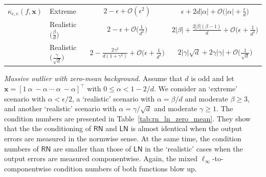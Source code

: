 \documentclass[namedate,webpdf,imanum]{ima-authoring-template}
\newcommand{\Matrix}[1]{\mathbf{#1}}
\newcommand{\trans}{\intercal}
\newcommand{\Layer}[1]{\mathsf{#1}}
\newcommand{\cond}[3][]{\kappa_{\mathrm{#2}} #1( #3 #1)}
\newcommand{\Oh}[2][]{\mathcal{O}#1( #2 #1)}
\numberwithin{equation}{section}
\begin{document}
\begin{table}[t]
\begin{tabular}{@{}llcc@{}}
\midrule
$\cond{c,c}{f,\Matrix{x}}$
& Extreme
& $2 - \epsilon + \Oh{\epsilon^2}$
& $\epsilon + 2d|\alpha| + \Oh[\Big]{|\alpha| + \frac{\epsilon}{d}}$ \\
%
& Realistic $\Big(\tfrac{\beta}{d}\Big)$
& $2 - \epsilon + \Oh[\Big]{\frac{1}{d^2}}$
& $2|\beta| + \frac{2|\beta|(\beta-1)}{d} + \Oh[\Big]{\epsilon + \frac{1}{d^2}}$ \\
%
& Realistic $\Big(\tfrac{\gamma}{\sqrt{d}}\Big)$
& $2 - \frac{2\gamma^2}{d(1+\gamma^2)} + \Oh[\Big]{\epsilon + \frac{1}{d^2}}$
& $2|\gamma|\sqrt{d} + 2\gamma|\gamma| + \Oh[\Big]{\frac{1}{\sqrt{d}}}$ \\
\midrule
\end{tabular}
\end{table}

\emph{Massive outlier with zero-mean background.}
Assume that $d$ is odd and let $\Matrix{x} = [1~\alpha~-\alpha~\cdots~\alpha~-\alpha]^\trans$ with $0 \leq \alpha < 1 - 2/d$.
We consider an `extreme' scenario with $\alpha < \epsilon/2$, a `realistic' scenario with $\alpha = \beta / d$ and moderate $\beta \geq 3$, and another `realistic' scenario with $\alpha = \gamma / \sqrt{d}$ and moderate $\gamma \geq 1$.
The condition numbers are presented in Table~\ref{tab:rn_ln_zero_mean}.
They show that the the conditioning of $\Layer{RN}$ and $\Layer{LN}$ is almost identical when the output errors are measured in the normwise sense.
At the same time, the condition numbers of $\Layer{RN}$ are smaller than those of $\Layer{LN}$ in the `realistic' cases when the output errors are measured componentwise.
Again, the mixed $\ell_\infty$-to-componentwise condition numbers of both functions blow up.
\end{document}
